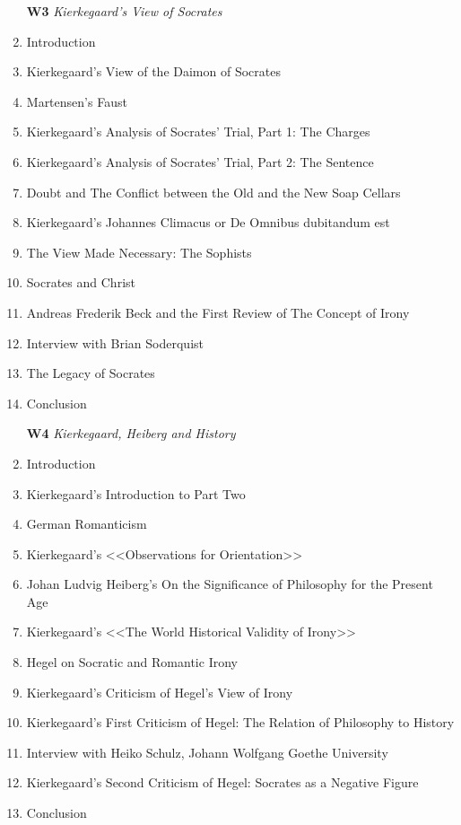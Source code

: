 \documentclass[a4paper]{article}
\begin{document}
\begin{multicols}{2}
\begin{enumerate}
\item[\bf W3] \textsl{Kierkegaard’s View of Socrates}
\item  Introduction
\item  Kierkegaard’s View of the Daimon of Socrates
\item  Martensen’s Faust
\item  Kierkegaard’s Analysis of Socrates’ Trial, Part 1: The Charges
\item  Kierkegaard’s Analysis of Socrates’ Trial, Part 2: The Sentence
\item  Doubt and The Conflict between the Old and the New Soap Cellars
\item  Kierkegaard’s Johannes Climacus or De Omnibus dubitandum est
\item  The View Made Necessary: The Sophists
\item  Socrates and Christ
\item  Andreas Frederik Beck and the First Review of The Concept of Irony
\item  Interview with Brian Soderquist
\item  The Legacy of Socrates
\item  Conclusion
\end{enumerate}

\begin{enumerate}
\item[\bf W4] \textsl{Kierkegaard, Heiberg and History}
\item  Introduction
\item  Kierkegaard’s Introduction to Part Two
\item  German Romanticism
\item  Kierkegaard’s <<Observations for Orientation>>
\item  Johan Ludvig Heiberg’s On the Significance of Philosophy for the Present Age
\item  Kierkegaard’s <<The World Historical Validity of Irony>>
\item  Hegel on Socratic and Romantic Irony
\item  Kierkegaard’s Criticism of Hegel’s View of Irony
\item  Kierkegaard’s First Criticism of Hegel: The Relation of Philosophy to History
\item  Interview with Heiko Schulz, Johann Wolfgang Goethe University
\item  Kierkegaard’s Second Criticism of Hegel: Socrates as a Negative Figure
\item  Conclusion
\end{enumerate}


\end{multicols}
\end{document}
